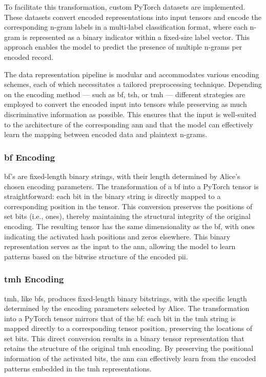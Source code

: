 To facilitate this transformation, custom PyTorch datasets are implemented.
These datasets convert encoded representations into input tensors and encode the corresponding n-gram labels in a multi-label classification format, where each n-gram is represented as a binary indicator within a fixed-size label vector.
This approach enables the model to predict the presence of multiple n-grams per encoded record.

The data representation pipeline is modular and accommodates various encoding schemes, each of which necessitates a tailored preprocessing technique.
Depending on the encoding method — such as \ac{bf}, \ac{tsh}, or \ac{tmh} — different strategies are employed to convert the encoded input into tensors while preserving as much discriminative information as possible.
This ensures that the input is well-suited to the architecture of the corresponding \ac{ann} and that the model can effectively learn the mapping between encoded data and plaintext n-grams.

\subsubsection{\ac{bf} Encoding}

\ac{bf}'s are fixed-length binary strings, with their length determined by Alice’s chosen encoding parameters.
The transformation of a \ac{bf} into a PyTorch tensor is straightforward: each bit in the binary string is directly mapped to a corresponding position in the tensor.
This conversion preserves the positions of set bits (i.e., ones), thereby maintaining the structural integrity of the original encoding.
The resulting tensor has the same dimensionality as the \ac{bf}, with ones indicating the activated hash positions and zeros elsewhere.
This binary representation serves as the input to the \ac{ann}, allowing the model to learn patterns based on the bitwise structure of the encoded \ac{pii}.

\subsubsection{\ac{tmh} Encoding}

\ac{tmh}, like \acp{bf}, produces fixed-length binary bitstrings, with the specific length determined by the encoding parameters selected by Alice.
The transformation into a PyTorch tensor mirrors that of the \ac{bf}: each bit in the \ac{tmh} string is mapped directly to a corresponding tensor position, preserving the locations of set bits.
This direct conversion results in a binary tensor representation that retains the structure of the original \ac{tmh} encoding.
By preserving the positional information of the activated bits, the \ac{ann} can effectively learn from the encoded patterns embedded in the \ac{tmh} representations.

